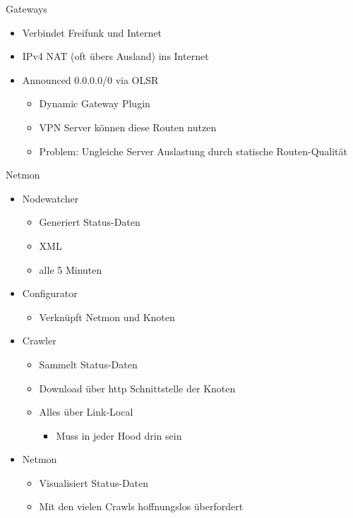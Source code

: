 \begin{frame}{Gateways}
    \begin{itemize}
        \item Verbindet Freifunk und Internet
        \item IPv4 NAT (oft übers Ausland) ins Internet
        \item Announced 0.0.0.0/0 via OLSR
        \begin{itemize}
            \item Dynamic Gateway Plugin
            \item VPN Server können diese Routen nutzen
            \item Problem: Ungleiche Server Auslastung durch statische Routen-Qualität
        \end{itemize}
    \end{itemize}
\end{frame}

\begin{frame}{Netmon}
    \begin{itemize}
        \item Nodewatcher
        \begin{itemize}
            \item Generiert Status-Daten
            \item XML
            \item alle 5 Minuten
        \end{itemize}
        \item Configurator
        \begin{itemize}
            \item Verknüpft Netmon und Knoten
        \end{itemize}
        \item Crawler
        \begin{itemize}
            \item Sammelt Status-Daten
            \item Download über http Schnittstelle der Knoten
            \item Alles über Link-Local
            \begin{itemize}
                \item Muss in jeder Hood drin sein
            \end{itemize}
        \end{itemize}
        \item Netmon
        \begin{itemize}
            \item Visualisiert Status-Daten
            \item Mit den vielen Crawls hoffnungslos überfordert
        \end{itemize}
    \end{itemize}
\end{frame}

